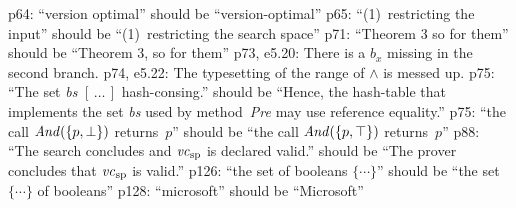 \e p64: ``version optimal'' should be ``version-optimal''
\e p65: ``(1)~restricting the input'' should be ``(1)~restricting the
  search space''
\e p71: ``Theorem 3 so for them'' should be ``Theorem 3, so for them''
\e p73, e5.20: There is a $b_x$ missing in the second branch.
\e p74, e5.22: The typesetting of the range of $\land$ is messed up.
\e p75: ``The set {\it bs\/} $[\,\ldots\,]$ hash-consing.'' should be ``Hence, the
  hash-table that implements the set {\it bs\/} used by method~{\it Pre} may
  use reference equality.''
\e p75: ``the call ${\it And}(\{p,\bot\})$ returns~$p$'' should be
  ``the call ${\it And}(\{p,\top\})$ returns~$p$''
\e p88: ``The search concludes and ${\it vc}_{\rm sp}$ is declared valid.''
  should be ``The prover concludes that ${\it vc}_{\rm sp}$ is valid.''
\e p126: ``the set of booleans $\{\cdots\}$'' should be ``the set $\{\cdots\}$
  of booleans''
\e p128: ``microsoft'' should be ``Microsoft''

\bye

